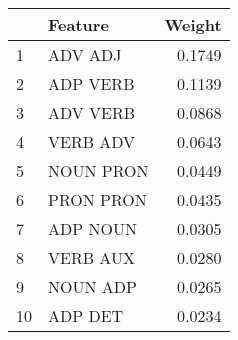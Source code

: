 \begin{tabular}{llr}
\toprule
{} &    Feature &  Weight \\
\midrule
1  &    ADV ADJ &  0.1749 \\
2  &   ADP VERB &  0.1139 \\
3  &   ADV VERB &  0.0868 \\
4  &   VERB ADV &  0.0643 \\
5  &  NOUN PRON &  0.0449 \\
6  &  PRON PRON &  0.0435 \\
7  &   ADP NOUN &  0.0305 \\
8  &   VERB AUX &  0.0280 \\
9  &   NOUN ADP &  0.0265 \\
10 &    ADP DET &  0.0234 \\
\bottomrule
\end{tabular}
